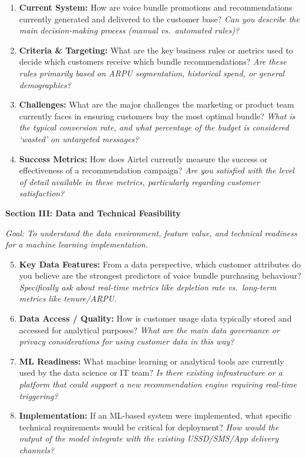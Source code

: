 \begin{enumerate}
    \item \textbf{Current System:} How are voice bundle promotions and recommendations currently generated and delivered to the customer base? \textit{Can you describe the main decision-making process (manual vs.\ automated rules)?}

    \item \textbf{Criteria \& Targeting:} What are the key business rules or metrics used to decide which customers receive which bundle recommendations? \textit{Are these rules primarily based on ARPU segmentation, historical spend, or general demographics?}

    \item \textbf{Challenges:} What are the major challenges the marketing or product team currently faces in ensuring customers buy the most optimal bundle? \textit{What is the typical conversion rate, and what percentage of the budget is considered `wasted' on untargeted messages?}

    \item \textbf{Success Metrics:} How does Airtel currently measure the success or effectiveness of a recommendation campaign? \textit{Are you satisfied with the level of detail available in these metrics, particularly regarding customer satisfaction?}
\end{enumerate}

\vspace{0.3cm}
\textbf{Section III: Data and Technical Feasibility}

\textit{Goal: To understand the data environment, feature value, and technical readiness for a machine learning implementation.}

\begin{enumerate}
    \setcounter{enumi}{4}
    \item \textbf{Key Data Features:} From a data perspective, which customer attributes do you believe are the strongest predictors of voice bundle purchasing behaviour? \textit{Specifically ask about real-time metrics like depletion rate vs.\ long-term metrics like tenure/ARPU.}

    \item \textbf{Data Access / Quality:} How is customer usage data typically stored and accessed for analytical purposes? \textit{What are the main data governance or privacy considerations for using customer data in this way?}

    \item \textbf{ML Readiness:} What machine learning or analytical tools are currently used by the data science or IT team? \textit{Is there existing infrastructure or a platform that could support a new recommendation engine requiring real-time triggering?}

    \item \textbf{Implementation:} If an ML-based system were implemented, what specific technical requirements would be critical for deployment? \textit{How would the output of the model integrate with the existing USSD/SMS/App delivery channels?}
\end{enumerate}

